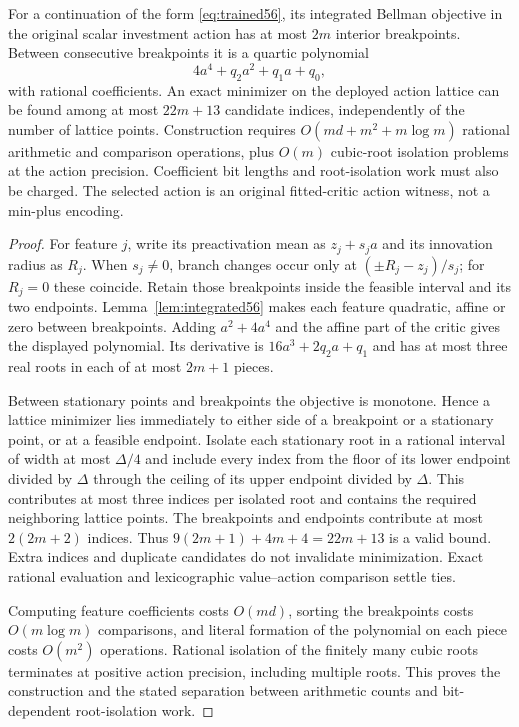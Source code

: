 \begin{theorem}\label{thm:algebraic56}
For a continuation of the form \eqref{eq:trained56}, its integrated Bellman objective in the original scalar investment action has at most $2m$ interior breakpoints. Between consecutive breakpoints it is a quartic polynomial
\[
 4a^4+q_2a^2+q_1a+q_0,
\]
with rational coefficients. An exact minimizer on the deployed action lattice can be found among at most $22m+13$ candidate indices, independently of the number of lattice points. Construction requires $O(md+m^2+m\log m)$ rational arithmetic and comparison operations, plus $O(m)$ cubic-root isolation problems at the action precision. Coefficient bit lengths and root-isolation work must also be charged. The selected action is an original fitted-critic action witness, not a min-plus encoding.
\end{theorem}
\begin{proof}
For feature $j$, write its preactivation mean as $z_j+s_ja$ and its innovation radius as $R_j$. When $s_j\ne0$, branch changes occur only at $(\pm R_j-z_j)/s_j$; for $R_j=0$ these coincide. Retain those breakpoints inside the feasible interval and its two endpoints. Lemma~\ref{lem:integrated56} makes each feature quadratic, affine or zero between breakpoints. Adding $a^2+4a^4$ and the affine part of the critic gives the displayed polynomial. Its derivative is $16a^3+2q_2a+q_1$ and has at most three real roots in each of at most $2m+1$ pieces.

Between stationary points and breakpoints the objective is monotone. Hence a lattice minimizer lies immediately to either side of a breakpoint or a stationary point, or at a feasible endpoint. Isolate each stationary root in a rational interval of width at most $\Delta/4$ and include every index from the floor of its lower endpoint divided by $\Delta$ through the ceiling of its upper endpoint divided by $\Delta$. This contributes at most three indices per isolated root and contains the required neighboring lattice points. The breakpoints and endpoints contribute at most $2(2m+2)$ indices. Thus $9(2m+1)+4m+4=22m+13$ is a valid bound. Extra indices and duplicate candidates do not invalidate minimization. Exact rational evaluation and lexicographic value--action comparison settle ties.

Computing feature coefficients costs $O(md)$, sorting the breakpoints costs $O(m\log m)$ comparisons, and literal formation of the polynomial on each piece costs $O(m^2)$ operations. Rational isolation of the finitely many cubic roots terminates at positive action precision, including multiple roots. This proves the construction and the stated separation between arithmetic counts and bit-dependent root-isolation work.
\end{proof}

